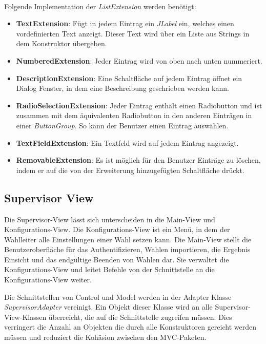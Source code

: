 \documentclass[parskip=full]{scrartcl}
\newcommand{\textitx}[1]{\mbox{\textit{#1}}}
\newcommand{\fakeparagraph}[1]{\textbf{#1}}
\begin{document}
		\\
		Folgende Implementation der \textitx{ListExtension} werden benötigt:
		\begin{itemize}
			\item\fakeparagraph{TextExtension}: Fügt in jedem Eintrag ein \textitx{JLabel} ein, welches einen vordefinierten Text anzeigt. Dieser Text wird über ein Liste aus Strings in dem Konstruktor übergeben.
			\item\fakeparagraph{NumberedExtension}: Jeder Eintrag wird von oben nach unten nummeriert.
			\item\fakeparagraph{DescriptionExtension}: Eine Schaltfläche auf jedem Eintrag öffnet ein Dialog Fenster, in dem eine Beschreibung geschrieben werden kann.
			\item\fakeparagraph{RadioSelectionExtension}: Jeder Eintrag enthält einen Radiobutton und ist zusammen mit dem äquivalenten Radiobutton in den anderen Einträgen in einer \textitx{ButtonGroup}. So kann der Benutzer einen Eintrag auswählen.
			\item\fakeparagraph{TextFieldExtension}: Ein Textfeld wird auf jedem Eintrag angezeigt.
			\item\fakeparagraph{RemovableExtension}: Es ist möglich für den Benutzer Einträge zu löschen, indem er auf die von der Erweiterung hinzugefügten Schaltfläche drückt.
		\end{itemize}
	
		\subsection{Supervisor View}
		Die Supervisor-View lässt sich unterscheiden in die Main-View und Konfigurations-View. Die Konfigurations-View ist ein Menü, in dem der Wahlleiter alle Einstellungen einer Wahl setzen kann. Die Main-View stellt die Benutzeroberfläche für das Authentifizieren, Wahlen importieren, die Ergebnis Einsicht und das endgültige Beenden von Wahlen dar. Sie verwaltet die Konfigurations-View und leitet Befehle von der Schnittstelle an die Konfigurations-View weiter.
		
		Die Schnittstellen von Control und Model werden in der Adapter Klasse \textitx{SupervisorAdapter} vereinigt. Ein Objekt dieser Klasse wird an alle Supervisor-View-Klassen überreicht, die auf die Schnittstelle zugreifen müssen. Dies verringert die Anzahl an Objekten die durch alle Konstruktoren gereicht werden müssen und reduziert die Kohäsion zwischen den MVC-Paketen.
		
\end{document}
